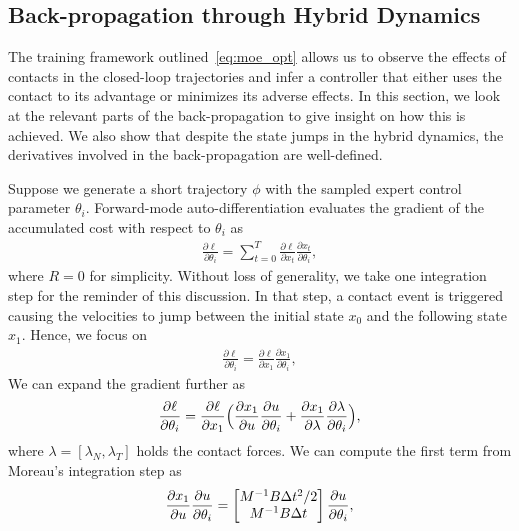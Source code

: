 \subsection{Back-propagation through Hybrid Dynamics}
\label{ssec:backprop_hybrid}

The training framework outlined~\eqref{eq:moe_opt} allows us to observe the
effects of contacts in the closed-loop trajectories and infer a controller that
either uses the contact to its advantage or minimizes its adverse effects.
%
In this section, we look at the relevant parts of the back-propagation to give
insight on how this is achieved.
%
We also show that despite the state jumps in the hybrid dynamics, the
derivatives involved in the back-propagation are well-defined.

Suppose we generate a short trajectory $\phi$ with the sampled expert control
parameter $\theta_i$.
%
Forward-mode auto-differentiation evaluates the gradient of the accumulated cost
with respect to $\theta_i$ as 
\begin{align*}
    \frac{\partial \ell}{\partial \theta_i} = \sum_{t=0}^{T} \frac{\partial \ell}{\partial x_t} \frac{\partial x_t}{\partial \theta_i} ,
\end{align*}
\noindent where $R=0$ for simplicity.
%
Without loss of generality, we take one integration step for the reminder of
this discussion. 
%
In that step, a contact event is triggered causing the velocities to jump
between the initial state $x_0$ and the following state $x_1$. 
%
Hence, we focus on 
\begin{align*}
    \frac{\partial \ell}{\partial \theta_i} = \frac{\partial \ell}{\partial x_1} \frac{\partial x_1}{\partial \theta_i},
\end{align*}
%
We can expand the gradient further as 
\begin{align*}
    \frac{\partial \ell}{\partial \theta_i} = \frac{\partial \ell}{\partial x_1} \Bigl( \frac{\partial x_1}{\partial u} \frac{\partial u}{\partial \theta_i} + \frac{\partial x_1}{\partial \lambda}\frac{\partial \lambda}{\partial \theta_i}\Bigr),
\end{align*}
\noindent where $\lambda=[\lambda_N, \lambda_T]$ holds the contact forces.
%
We can compute the first term from Moreau's integration step as
\begin{align*}
    \frac{\partial x_1}{\partial u} \frac{\partial u}{\partial \theta_i} = 
    \begin{bmatrix}M^{-1}B \Delta t^2/2 \\ M^{-1}B \Delta t\end{bmatrix} \frac{\partial u}{\partial \theta_i},
\end{align*} 
